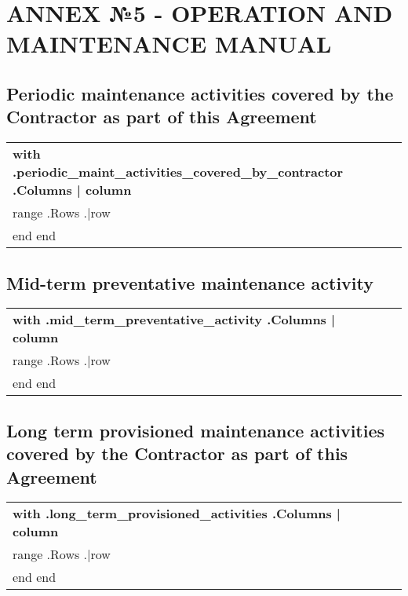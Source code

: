 \section{ANNEX №5 {-} OPERATION AND MAINTENANCE MANUAL}

\subsection{Periodic maintenance activities covered by the Contractor as part of this Agreement}


\begin{center}
\begin{tabu}{|X[3]|X|X|X|X|} \tabucline{} \rowfont[c]\bfseries
{{with .periodic_maint_activities_covered_by_contractor}} %
	{{.Columns | column}} \\\tabucline{}
	{{range .Rows}} %
	{{.|row}} \\\tabucline{}
	{{end}}
{{end}}
\end{tabu}
\end{center}

\subsection{Mid-term preventative maintenance activity}


\begin{center}
\begin{tabu}{|X[3]|X|X|X|X|} \tabucline{} \rowfont[c]\bfseries
{{with .mid_term_preventative_activity}} %
	{{.Columns | column}} \\\tabucline{}
	{{range .Rows}} %
	{{.|row}} \\\tabucline{}
	{{end}}
{{end}}
\end{tabu}
\end{center}

\subsection{Long term provisioned maintenance activities covered by the Contractor as part of this Agreement}


\begin{center}
\begin{tabu}{|X[3]|X|X|X|X|} \tabucline{} \rowfont[c]\bfseries
{{with .long_term_provisioned_activities}} %
	{{.Columns | column}} \\\tabucline{}
	{{range .Rows}} %
	{{.|row}} \\\tabucline{}
	{{end}}
{{end}}
\end{tabu}
\end{center}

